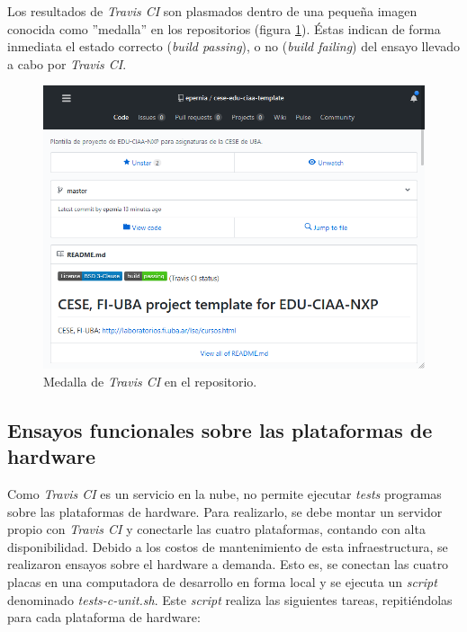 Los resultados de \emph{Travis CI} son plasmados dentro de una pequeña imagen conocida como ''medalla'' en los repositorios (figura \ref{fig:travisBadge}). Éstas indican de forma inmediata el estado correcto (\emph{build passing}), o no (\emph{build failing}) del ensayo llevado a cabo por \emph{Travis CI}. 

\begin{figure}[!htbp]
\begin{center}  %
\includegraphics*[width=14cm]{Figures/travisBadge.png}
\par\caption{Medalla de \emph{Travis CI} en el repositorio.}\label{fig:travisBadge}
\end{center}
\end{figure}

\subsection{Ensayos funcionales sobre las plataformas de hardware}

Como \emph{Travis CI} es un servicio en la nube, no permite ejecutar \emph{tests} programas sobre las plataformas de hardware. Para realizarlo, se debe montar un servidor propio con \emph{Travis CI} y conectarle las cuatro plataformas, contando con alta disponibilidad. Debido a los costos de mantenimiento de esta infraestructura, se realizaron ensayos sobre el hardware a demanda. Esto es, se conectan las cuatro placas en una computadora de desarrollo en forma local y se ejecuta un \emph{script} denominado \emph{tests-c-unit.sh}. Este \emph{script} realiza las siguientes tareas, repitiéndolas para cada plataforma de hardware:

